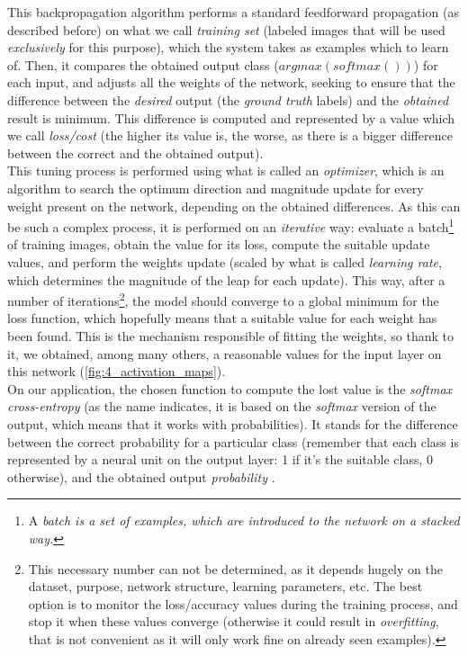 			This backpropagation algorithm \cite{Rumelhart1986} performs a standard feedforward propagation (as described before) on what we call \emph{training set} (labeled images that will be used \emph{exclusively} for this purpose), which the system takes as examples which to learn of. Then, it compares the obtained output class ($argmax(softmax())$) for each input, and adjusts all the weights of the network, seeking to ensure that the difference between the \emph{desired} output (the \emph{ground truth} labels) and the \emph{obtained} result is minimum. This difference is computed and represented by a value which we call \emph{loss/cost} (the higher its value is, the worse, as there is a bigger difference between the correct and the obtained output).\\
			
			This tuning process is performed using what is called an \emph{optimizer}, which is an algorithm to search the optimum direction and magnitude update for every weight present on the network, depending on the obtained differences. As this can be such a complex process, it is performed on an \emph{iterative} way: evaluate a batch\footnote{A \emph{batch is a set of examples, which are introduced to the network on a stacked way.}} of training images, obtain the value for its loss, compute the suitable update values, and perform the weights update (scaled by what is called \emph{learning rate}, which determines the magnitude of the leap for each update). This way, after a number of iterations\footnote{This necessary number can not be determined, as it depends hugely on the dataset, purpose, network structure, learning parameters, etc. The best option is to monitor the loss/accuracy values during the training process, and stop it when these values converge (otherwise it could result in \emph{overfitting}, that is not convenient as it will only work fine on already seen examples).}, the model should converge to a global minimum for the loss function, which hopefully means that a suitable value for each weight has been found. This is the mechanism responsible of fitting the weights, so thank to it, we obtained, among many others, a reasonable values for the input layer on this network (\autoref{fig:4_activation_maps}).\\
			
			On our application, the chosen function to compute the lost value is the \emph{softmax cross-entropy} (as the name indicates, it is based on the \emph{softmax} version of the output, which means that it works with probabilities). It stands for the difference between the correct probability for a particular class (remember that each class is represented by a neural unit on the output layer: 1 if it's the suitable class, 0 otherwise), and the obtained output \emph{probability} \cite{cross-entropy}.
			
